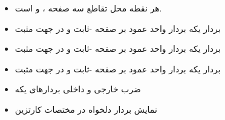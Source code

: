 \ELhold


\begin{ELunit}


\begin{itemize}
\item
  هر نقطه  محل تقاطع سه صفحه ،  و  است.
\item
  بردار یکه  \ELim{\ELto} بردار واحد عمود بر صفحه -ثابت و در جهت مثبت
\item
  بردار یکه  \ELim{\ELto} بردار واحد عمود بر صفحه -ثابت و در جهت مثبت
\item
  بردار یکه  \ELim{\ELto} بردار واحد عمود بر صفحه -ثابت و در جهت مثبت
\item
  ضرب خارجی و داخلی بردارهای یکه
\end{itemize}




\end{ELunit}

\begin{ELjoin}

\begin{itemize}
\tightlist
\item
  نمایش بردار دلخواه  در مختصات کارتزین
\end{itemize}

\begin{ELimportant}{}


\end{ELimportant}

\end{ELjoin}

